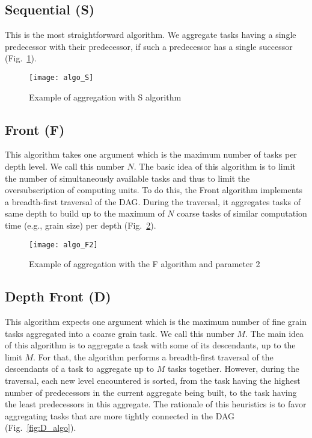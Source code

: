 \subsection{Sequential (S)}
This is the most straightforward algorithm.
%
We aggregate tasks having a single predecessor with their predecessor, if such a predecessor has a single successor (Fig.~\ref{fig:S_algo}).
\begin{figure}[!ht]
  \centering
  \texttt{[image: algo\_S]}
  \caption{Example of aggregation with S algorithm}
  \label{fig:S_algo}
\end{figure}


\subsection{Front (F)}
This algorithm takes one argument which is the maximum number of
tasks per depth level. We call this number $N$. The basic idea of
this algorithm is to limit the number of simultaneously available
tasks and thus to limit the oversubscription of computing units.
To do this, the Front algorithm implements a breadth-first traversal
of the DAG. During the traversal, it aggregates tasks of same
depth to build up to the maximum of $N$ coarse tasks of similar computation
time (e.g., grain size) per depth (Fig.~\ref{fig:F_algo}).

\begin{figure}[!ht]
  \centering
  \texttt{[image: algo\_F2]}
  \caption{Example of aggregation with the F algorithm and parameter 2}
  \label{fig:F_algo}
\end{figure}


\subsection{Depth Front (D)}
This algorithm expects one argument which is the maximum number of
fine grain tasks aggregated into a coarse grain task. We call this
number $M$.
The main idea of this algorithm is to aggregate a task with some
of its descendants, up to the limit $M$. For that, the algorithm
performs a breadth-first traversal of the descendants of a task to
aggregate up to $M$ tasks together. However, during the traversal, each new
level encountered is sorted, from the task having the highest
number of predecessors in the current aggregate being built, to
the task having the least predecessors in this aggregate. The
rationale of this heuristics is to favor aggregating tasks that
are more tightly connected in the DAG (Fig.~\ref{fig:D_algo}).


